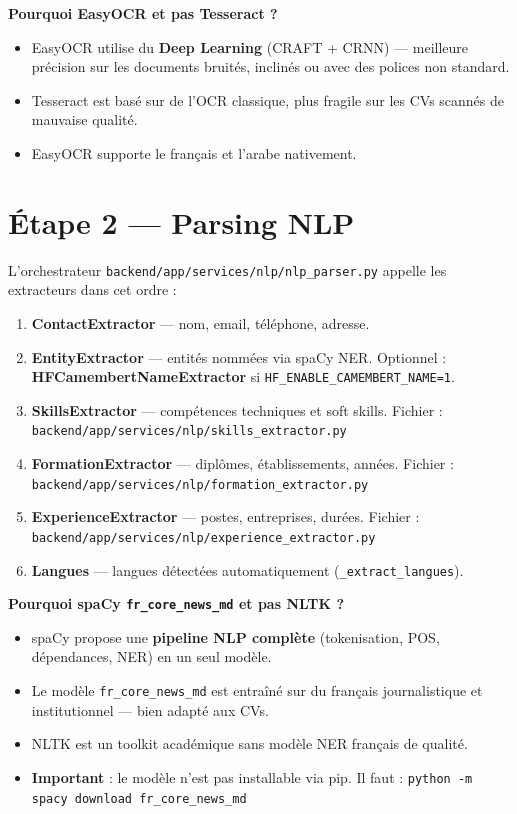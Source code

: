 \documentclass[12pt,a4paper]{report}
\newenvironment{whybox}[1][Pourquoi ce choix ?]{%
  \colorbox{yellow!20}{\textbf{\textcolor{navyblue}{#1}}}\vspace{2pt}
  \begin{framed}%
}{\end{framed}}
\newcommand{\filepath}[1]{\texttt{\small\textcolor{codeblue}{#1}}}
\begin{document}
\begin{whybox}[Pourquoi EasyOCR et pas Tesseract ?]
\begin{itemize}
  \item EasyOCR utilise du \textbf{Deep Learning} (CRAFT + CRNN) — meilleure précision
        sur les documents bruités, inclinés ou avec des polices non standard.
  \item Tesseract est basé sur de l'OCR classique, plus fragile sur les CVs
        scannés de mauvaise qualité.
  \item EasyOCR supporte le français et l'arabe nativement.
\end{itemize}
\end{whybox}

\section{Étape 2 — Parsing NLP}

L'orchestrateur \filepath{backend/app/services/nlp/nlp\_parser.py} appelle
les extracteurs dans cet ordre :

\begin{enumerate}
  \item \textbf{ContactExtractor} — nom, email, téléphone, adresse.
  \item \textbf{EntityExtractor} — entités nommées via spaCy NER.
        Optionnel : \textbf{HFCamembertNameExtractor} si \texttt{HF\_ENABLE\_CAMEMBERT\_NAME=1}.
  \item \textbf{SkillsExtractor} — compétences techniques et soft skills.
        Fichier : \filepath{backend/app/services/nlp/skills\_extractor.py}
  \item \textbf{FormationExtractor} — diplômes, établissements, années.
        Fichier : \filepath{backend/app/services/nlp/formation\_extractor.py}
  \item \textbf{ExperienceExtractor} — postes, entreprises, durées.
        Fichier : \filepath{backend/app/services/nlp/experience\_extractor.py}
  \item \textbf{Langues} — langues détectées automatiquement (\texttt{\_extract\_langues}).
\end{enumerate}

\begin{whybox}[Pourquoi spaCy \texttt{fr\_core\_news\_md} et pas NLTK ?]
\begin{itemize}
  \item spaCy propose une \textbf{pipeline NLP complète} (tokenisation, POS, dépendances, NER)
        en un seul modèle.
  \item Le modèle \texttt{fr\_core\_news\_md} est entraîné sur du français journalistique
        et institutionnel — bien adapté aux CVs.
  \item NLTK est un toolkit académique sans modèle NER français de qualité.
  \item \textbf{Important} : le modèle n'est pas installable via pip. Il faut :
        \texttt{python -m spacy download fr\_core\_news\_md}
\end{itemize}
\end{whybox}
\end{document}

